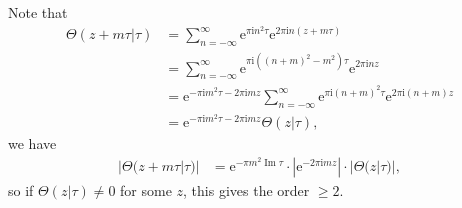 \documentclass[11pt]{report}
\theoremstyle{mythm}
\let\oldendproof\endproof
\renewenvironment{proof}[1][\proofname]{%
  \oldproof[\normalfont \bfseries #1]%
}{\oldendproof}
\renewcommand*{\proofname}{Proof}
\theoremstyle{myans}
\newcommand{\mi}{\mathrm{i}}
\newcommand{\me}{\mathrm{e}}
\renewcommand{\Im}{\operatorname{Im}}
\begin{document}
\begin{enumerate}
\begin{proof}
    Note that
    \begin{align*}
      \Theta(z+m\tau | \tau) &= \sum_{n=-\infty}^{\infty} \me^{\pi \mi n^2 \tau} \me^{2\pi \mi n (z+m\tau)}\\
      &= \sum_{n=-\infty}^{\infty} \me^{\pi \mi ((n+m)^2-m^2) \tau} \me^{2\pi \mi n z}\\
      &= \me^{-\pi \mi m^2 \tau - 2\pi \mi m z} \sum_{n=-\infty}^{\infty} \me^{\pi \mi (n+m)^2 \tau} \me^{2\pi \mi (n+m) z}\\
      &= \me^{-\pi \mi m^2 \tau - 2\pi \mi m z} \Theta(z|\tau),
    \end{align*}
    we have
    \begin{align*}
      |\Theta(z+m\tau | \tau)| &= \me^{-\pi m^2 \Im \tau} \cdot |\me^{- 2\pi \mi m z}|\cdot |\Theta(z|\tau)|,
    \end{align*}
    so if $\Theta(z|\tau) \neq 0$ for some $z$, this gives the order $\geq 2$.


\end{proof}
\end{enumerate}
\end{document}
